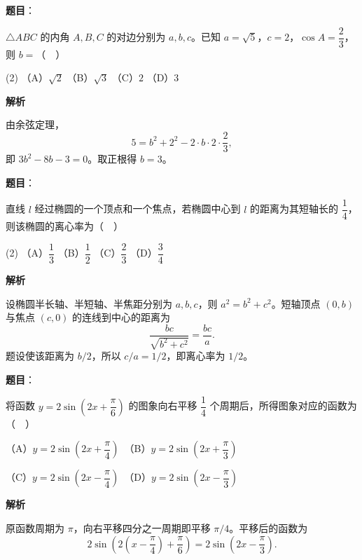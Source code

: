 \begin{answer}

\textbf{题目}：

\(\triangle ABC\) 的内角 \(A,B,C\) 的对边分别为 \(a,b,c\)。已知 \(a=\sqrt{5}\)，\(c=2\)，\(\cos A=\dfrac{2}{3}\)，则 \(b=\)（　）

\begin{gkopts}(2)
\task （A）\(\sqrt{2}\)
\task （B）\(\sqrt{3}\)
\task （C）\(2\)
\task （D）\(3\)
\end{gkopts}

\textbf{解析}

由余弦定理，
\nopagebreak[4]
\[
5=b^2+2^2-2\cdot b\cdot2\cdot\frac23,
\]
即 \(3b^2-8b-3=0\)。取正根得 \(b=3\)。


\end{answer}
\begin{answer}

\textbf{题目}：

直线 \(l\) 经过椭圆的一个顶点和一个焦点，若椭圆中心到 \(l\) 的距离为其短轴长的 \(\dfrac{1}{4}\)，则该椭圆的离心率为（　）

\begin{gkopts}(2)
\task （A）\(\dfrac{1}{3}\)
\task （B）\(\dfrac{1}{2}\)
\task （C）\(\dfrac{2}{3}\)
\task （D）\(\dfrac{3}{4}\)
\end{gkopts}

\textbf{解析}

设椭圆半长轴、半短轴、半焦距分别为 \(a,b,c\)，则 \(a^2=b^2+c^2\)。短轴顶点 \((0,b)\) 与焦点 \((c,0)\) 的连线到中心的距离为
\nopagebreak[4]
\[
\frac{bc}{\sqrt{b^2+c^2}}=\frac{bc}{a}.
\]
题设使该距离为 \(b/2\)，所以 \(c/a=1/2\)，即离心率为 \(1/2\)。


\end{answer}
\begin{answer}

\textbf{题目}：

将函数 \(y=2\sin\left(2x+\dfrac{\pi}{6}\right)\) 的图象向右平移 \(\dfrac{1}{4}\) 个周期后，所得图象对应的函数为（　）

   （A）\(y=2\sin\left(2x+\dfrac{\pi}{4}\right)\)　（B）\(y=2\sin\left(2x+\dfrac{\pi}{3}\right)\)

   （C）\(y=2\sin\left(2x-\dfrac{\pi}{4}\right)\)　（D）\(y=2\sin\left(2x-\dfrac{\pi}{3}\right)\)

\textbf{解析}

原函数周期为 \(\pi\)，向右平移四分之一周期即平移 \(\pi/4\)。平移后的函数为
\nopagebreak[4]
\[
2\sin\left(2(x-\frac\pi4)+\frac\pi6\right)
=2\sin(2x-\frac\pi3).
\]


\end{answer}
